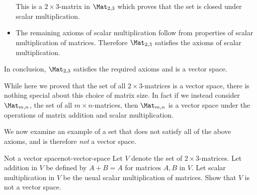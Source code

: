 \begin{solution}
\begin{itemize}
This is a $2 \times 3$-matrix in $\Mat_{2,3}$ which proves that the set is closed under scalar multiplication. 

\item The remaining axioms of scalar multiplication follow from properties of scalar multiplication of matrices. Therefore $\Mat_{2,3}$ satisfies the axioms of scalar multiplication. 
\end{itemize}

In conclusion, $\Mat_{2,3}$ satisfies the required axioms and is a vector space. 
\end{solution}

While here we proved that the set of all $2 \times 3$-matrices is a vector space, there is nothing special about this choice of matrix size. In fact if we instead consider $\Mat_{m,n}$, the set of all $m \times n$-matrices, then  $\Mat_{m,n}$ is a vector space under the operations of matrix addition and scalar multiplication. 

We now examine an example of a set that does not satisfy all of the above axioms, and is therefore \textit{not} a vector space. 

\begin{example}{Not a vector space}{not-vector-space}
Let $V$ denote the set of $2 \times 3$-matrices. Let addition in $V$ be defined by $A + B = A$ for matrices $A,B$ in $V$. Let scalar multiplication in $V$ be the usual scalar multiplication of matrices. Show that $V$ is not a vector space.
\end{example}

